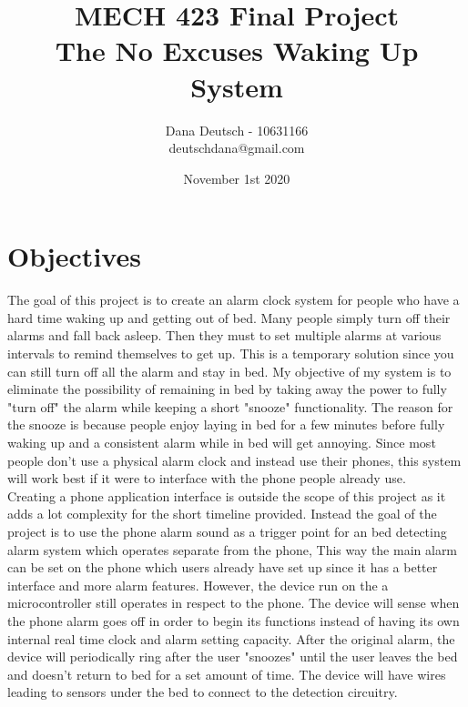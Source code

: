 \documentclass[11pt]{article}
\title{MECH 423 Final Project \\
		The No Excuses Waking Up System}
\author{Dana Deutsch - 10631166\\
		deutschdana@gmail.com}
\date{November 1st 2020}
\begin{document}
\maketitle
\newpage
\tableofcontents
\newpage

\section{Objectives}
The goal of this project is to create an alarm clock system for people who have a hard time waking up and getting out of bed.
Many people simply turn off their alarms and fall back asleep.
Then they must to set multiple alarms at various intervals to remind themselves to get up.
This is a temporary solution since you can still turn off all the alarm and stay in bed.
My objective of my system is to eliminate the possibility of remaining in bed by taking away the power to fully "turn off" the alarm while keeping a short "snooze" functionality. 
The reason for the snooze is because people enjoy laying in bed for a few minutes before fully waking up and a consistent alarm while in bed will get annoying. 
Since most people don't use a physical alarm clock and instead use their phones, this system will work best if it were to interface with the phone people already use.\\

Creating a phone application interface is outside the scope of this project as it adds a lot  complexity for the short timeline provided. 
Instead the goal of the project is to use the phone alarm sound as a trigger point for an bed detecting alarm system which operates separate from the phone,
This way the main alarm can be set on the phone which users already have set up since it has a better interface and more alarm features.
However, the device run on the a microcontroller still operates in respect to the phone. 
The device will sense when the phone alarm goes off in order to begin its functions instead of having its own internal real time clock and alarm setting capacity.  
After the original alarm, the device will periodically ring after the user "snoozes" until the user leaves the bed and doesn't return to bed for a set amount of time. 
The device will have wires leading to sensors under the bed to connect to the detection circuitry.
\end{document}
